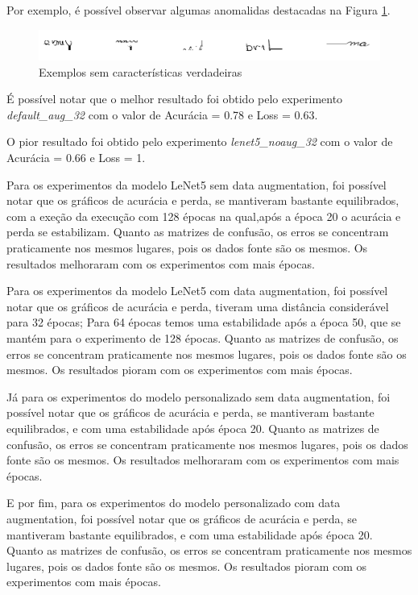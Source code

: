 \documentclass[12pt]{article}
\begin{document}
Por exemplo, é possível observar algumas anomalidas destacadas na Figura \ref{fig:image_months_wrong}.

\begin{figure}[!htb]
  \centering
  \includegraphics[width=35em]{images/image_months_wrong.png}
  \caption{Exemplos sem características verdadeiras}
  \label{fig:image_months_wrong}
\end{figure}

É possível notar que o melhor resultado foi obtido pelo experimento \textit{default\_aug\_32} com o valor de Acurácia = 0.78 e Loss = 0.63.

O pior resultado foi obtido pelo experimento \textit{lenet5\_noaug\_32} com o valor de Acurácia = 0.66 e Loss = 1.

Para os experimentos da modelo LeNet5 sem data augmentation, foi possível notar que os gráficos de acurácia e perda, se mantiveram bastante equilibrados, com a exeção da execução com 128 épocas na qual,após a época 20 o acurácia e perda se estabilizam. Quanto as matrizes de confusão, os erros se concentram praticamente nos mesmos lugares, pois os dados fonte são os mesmos. Os resultados melhoraram com os experimentos com mais épocas.

Para os experimentos da modelo LeNet5 com data augmentation, foi possível notar que os gráficos de acurácia e perda, tiveram uma distância considerável para 32 épocas; Para 64 épocas temos uma estabilidade após a época 50, que se mantém para o experimento de 128 épocas. Quanto as matrizes de confusão, os erros se concentram praticamente nos mesmos lugares, pois os dados fonte são os mesmos. Os resultados pioram com os experimentos com mais épocas.

Já para os experimentos do modelo personalizado sem data augmentation, foi possível notar que os gráficos de acurácia e perda, se mantiveram bastante equilibrados, e com uma estabilidade após época 20. Quanto as matrizes de confusão, os erros se concentram praticamente nos mesmos lugares, pois os dados fonte são os mesmos. Os resultados melhoraram com os experimentos com mais épocas.

E por fim, para os experimentos do modelo personalizado com data augmentation, foi possível notar que os gráficos de acurácia e perda, se mantiveram bastante equilibrados, e com uma estabilidade após época 20. Quanto as matrizes de confusão, os erros se concentram praticamente nos mesmos lugares, pois os dados fonte são os mesmos. Os resultados pioram com os experimentos com mais épocas.
\end{document}
